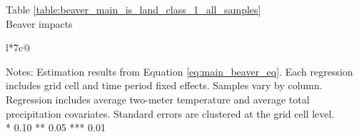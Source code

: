 \begin{table}[htb]
\captionlistentry[table]{}
\label{table:beaver_main_is_land_class_1_all_samples}
\centering
Table \ref{table:beaver_main_is_land_class_1_all_samples} \\
Beaver impacts \\
\begin{threeparttable}
\begin{tabulary}{\textwidth}{l*{7}{c}@{}}
\toprule \toprule
\noalign{\smallskip}
\noalign{\smallskip}
\midrule \bottomrule
\end{tabulary}
\medskip
\begin{tablenotes}[flushleft]
\setlength{}
\item
\footnotesize
\justify
Notes: Estimation results from Equation \eqref{eq:main_beaver_eq}.
Each regression includes grid cell and time period fixed effects.
Samples vary by column. Regression includes average two-meter temperature and average total precipitation covariates.
Standard errors are clustered at the grid cell level. \\
\mbox{*} 0.10 ** 0.05 *** 0.01
\end{tablenotes}
\end{threeparttable}
\end{table}
